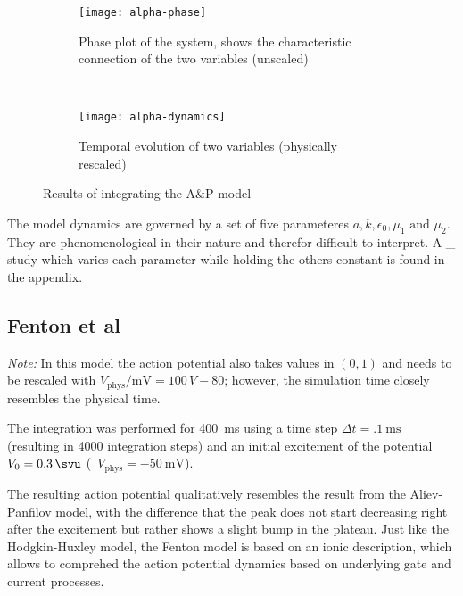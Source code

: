 \begin{figure}[h]
    \centering
    \begin{subfigure}[b]{.45\textwidth}
        \texttt{[image: alpha-phase]}
        \vspace{-\baselineskip}
        \label{fig:alphaphase}
        \caption{Phase plot of the system, shows the characteristic connection
        of the two variables (unscaled)}
    \end{subfigure}
    ~
    \begin{subfigure}[b]{.45\textwidth}
        \texttt{[image: alpha-dynamics]}
        \vspace{-\baselineskip}
        \label{fig:alphadyn}
        \caption{Temporal evolution of two variables (physically rescaled)}
    \end{subfigure}
    \label{fig:alpha1}
    \caption{Results of integrating the A\&P model}
\end{figure}

The model dynamics are governed by a set of five parameteres $a, k, \epsilon_0,
\mu_1\text{ and }\mu_2$. They are phenomenological in their nature and therefor
difficult to interpret. A \_ study which varies each
parameter while holding the others constant is found in the appendix.


\subsection{Fenton et al}
\emph{Note:} In this model the action potential also takes values in $(0,1)$
and needs to be rescaled with $V_{\mathrm{phys}}/\si{\milli\volt}=100\,V-80$;
however, the simulation time closely resembles the physical time.

\vspace{\baselineskip}
The integration was performed for \SI{400}{\milli\second} using a time step
$\Delta{t}=\SI{.1}{\milli\second}$ (resulting in 4000 integration steps) and
an initial excitement of the potential $V_0=\SI{.3}{\svu}$
(\ie~$V_{\mathrm{phys}}=\SI{-50}{\milli\volt}$).

The resulting action potential qualitatively resembles the result from the
Aliev-Panfilov model, with the difference that the peak does not start
decreasing right after the excitement but rather shows a slight bump in the
plateau.
Just like the Hodgkin-Huxley model, the Fenton model is  based on an ionic
description, which allows to comprehed the action potential dynamics based on
underlying gate and current processes.

